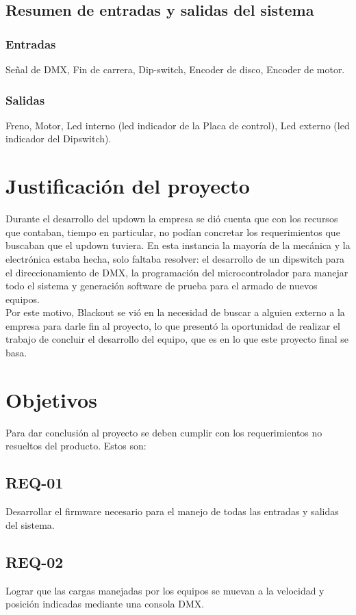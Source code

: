 \subsection{Resumen de entradas y salidas del sistema}
\subsubsection{Entradas} 
Señal de DMX, Fin de carrera, Dip-switch, Encoder de disco, Encoder de motor.\\
\subsubsection{Salidas}
Freno, Motor, Led interno (led indicador de la Placa de control), Led externo (led indicador del Dipswitch).

\newpage
\section{Justificación del proyecto} \label{sec:\thesection}
Durante el desarrollo del updown la empresa se dió cuenta que con los recursos que contaban, tiempo en particular, no podían concretar los requerimientos que buscaban que el updown tuviera. En esta instancia la mayoría de la mecánica y la electrónica estaba hecha, solo faltaba resolver: el desarrollo de un dipswitch para el direccionamiento de DMX, la programación del microcontrolador para manejar todo el sistema y generación software de prueba para el armado de nuevos equipos.\\

Por este motivo, Blackout se vió en la necesidad de buscar a alguien externo a la empresa para darle fin al proyecto, lo que presentó la oportunidad de realizar el trabajo de concluir el desarrollo del equipo, que es en lo que este proyecto final se basa.

\section{Objetivos} \label{sec:\thesection}
Para dar conclusión al proyecto se deben cumplir con los requerimientos no resueltos del producto. Estos son:
\subsection{REQ-01}
Desarrollar el firmware necesario para el manejo de todas las entradas y salidas del sistema.
\subsection{REQ-02}
Lograr que las cargas manejadas por los equipos se muevan a la velocidad y posición indicadas mediante una consola DMX.
